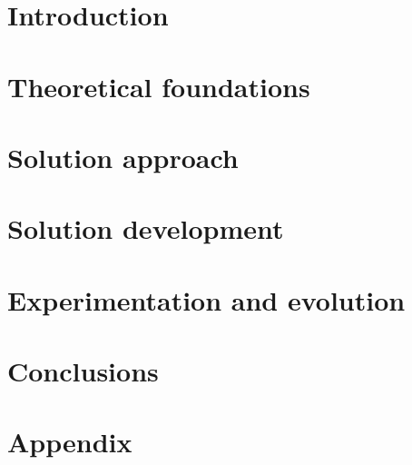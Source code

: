 \documentclass{templateDeusto}
\begin{document}
	\chapter{Introduction}
	
	
	\chapter{Theoretical foundations}
	
	
	\chapter{Solution approach}
		
	
	\chapter{Solution development}
	
	
	\chapter{Experimentation and evolution}
	
	
	\chapter{Conclusions}
	
	
	
	\chapter{Appendix} %
	
	
	\appendix
	
	
\end{document}
